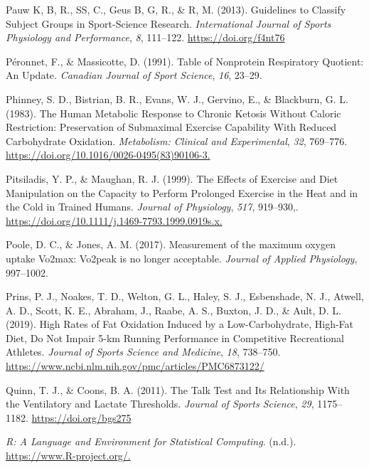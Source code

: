 \documentclass[]{cik}%
\newlength{\cslhangindent}
\newlength{\cslentryspacingunit} %
\newenvironment{CSLReferences}[2] %
 {%
  \setlength{\parindent}{0pt}
  \ifodd #1
  \let\oldpar\par
  \def\par{\hangindent=\cslhangindent\oldpar}
  \fi
  \setlength{\parskip}{#2\cslentryspacingunit}
 }%
 {}
\begin{document}
\begin{CSLReferences}{1}{0}
\leavevmode{}%
Pauw K, B, R., SS, C., Geus B, G, R., \& R, M. (2013). Guidelines to
Classify Subject Groups in Sport-Science Research. \emph{International
Journal of Sports Physiology and Performance}, \emph{8}, 111--122.
\url{https://doi.org/f4nt76}

\leavevmode{}%
Péronnet, F., \& Massicotte, D. (1991). Table of Nonprotein Respiratory
Quotient: An Update. \emph{Canadian Journal of Sport Science},
\emph{16}, 23--29.

\leavevmode{}%
Phinney, S. D., Bistrian, B. R., Evans, W. J., Gervino, E., \&
Blackburn, G. L. (1983). The Human Metabolic Response to Chronic Ketosis
Without Caloric Restriction: Preservation of Submaximal Exercise
Capability With Reduced Carbohydrate Oxidation. \emph{Metabolism:
Clinical and Experimental}, \emph{32}, 769--776.
\url{https://doi.org/10.1016/0026-0495(83)90106-3.}

\leavevmode{}%
Pitsiladis, Y. P., \& Maughan, R. J. (1999). The Effects of Exercise and
Diet Manipulation on the Capacity to Perform Prolonged Exercise in the
Heat and in the Cold in Trained Humans. \emph{Journal of Physiology},
\emph{517}, 919--930,.
\url{https://doi.org/10.1111/j.1469-7793.1999.0919s.x.}

\leavevmode{}%
Poole, D. C., \& Jones, A. M. (2017). Measurement of the maximum oxygen
uptake Vo2max: Vo2peak is no longer acceptable. \emph{Journal of Applied
Physiology}, 997--1002.

\leavevmode{}%
Prins, P. J., Noakes, T. D., Welton, G. L., Haley, S. J., Esbenshade, N.
J., Atwell, A. D., Scott, K. E., Abraham, J., Raabe, A. S., Buxton, J.
D., \& Ault, D. L. (2019). High Rates of Fat Oxidation Induced by a
Low-Carbohydrate, High-Fat Diet, Do Not Impair 5-km Running Performance
in Competitive Recreational Athletes. \emph{Journal of Sports Science
and Medicine}, \emph{18}, 738--750.
\url{https://www.ncbi.nlm.nih.gov/pmc/articles/PMC6873122/}

\leavevmode{}%
Quinn, T. J., \& Coons, B. A. (2011). The Talk Test and Its Relationship
With the Ventilatory and Lactate Thresholds. \emph{Journal of Sports
Science}, \emph{29}, 1175--1182. \url{https://doi.org/bgs275}

\leavevmode{}%
\emph{R: A Language and Environment for Statistical Computing}. (n.d.).
\url{https://www.R-project.org/.}


\end{CSLReferences}
\end{document}
